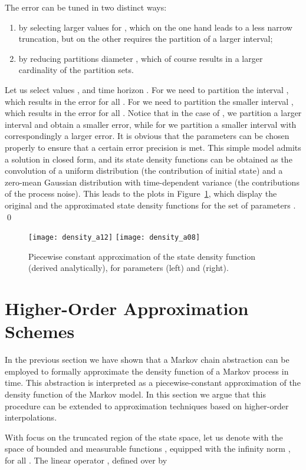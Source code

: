 \documentclass{LMCS}
\begin{document}
The error can be tuned in two distinct ways: 
\begin{enumerate}
\item 
by selecting larger values for , 
which on the one hand leads to a less narrow truncation, 
but on the other requires the partition of a larger interval;  
\item 
by reducing partitions diameter , which of course results in a larger cardinality of the partition sets.   
\end{enumerate}
Let us select values , and time horizon . 
For  we need to partition the interval , 
which results in the error  for all .
For  we need to partition the smaller interval
, 
which results in the error  for all . 
Notice that in the case of , 
we partition a larger interval and obtain a smaller error, 
while for  we partition a smaller interval with correspondingly a larger error. 
It is obvious that the parameters  can be chosen properly to ensure that a certain error precision is met.
This simple model admits a solution in closed form, 
and its state density functions can be obtained as the convolution of a uniform distribution (the contribution of initial state) and a zero-mean Gaussian distribution with time-dependent variance (the contributions of the process noise). 
This leads to the plots in Figure~\ref{fig:1d_density}, 
which display the original and the approximated state density functions for the set of parameters . 
\hfill \qed
\begin{figure}
\centering
\texttt{[image: density\_a12]}
\texttt{[image: density\_a08]}
\caption{Piecewise constant approximation  of the state density function  (derived analytically), 
for parameters  (left) and  (right).} 
\label{fig:1d_density}
\end{figure}

\section{Higher-Order Approximation Schemes}
\label{sec:approx&error}
In the previous section we have shown that a Markov chain abstraction can be employed to formally approximate the density function of a Markov process in time. 
This abstraction is interpreted as a piecewise-constant approximation of the density function of the Markov model. 
In this section we argue that this procedure can be extended to approximation techniques based on higher-order interpolations. 

With focus on the truncated region of the state space, 
let us denote with  the space of bounded and measurable functions ,
equipped with the infinity norm
, 
for all . 
The linear operator , defined over  by 
\end{document}
